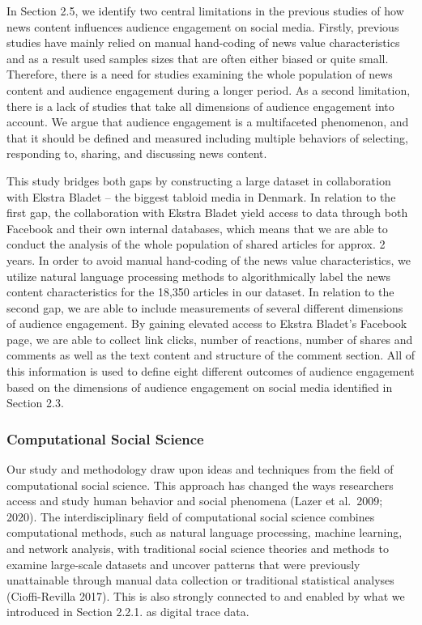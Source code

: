 \documentclass[
]{article}
\begin{document}
In Section 2.5, we identify two central limitations in the previous
studies of how news content influences audience engagement on social
media. Firstly, previous studies have mainly relied on manual
hand-coding of news value characteristics and as a result used samples
sizes that are often either biased or quite small. Therefore, there is a
need for studies examining the whole population of news content and
audience engagement during a longer period. As a second limitation,
there is a lack of studies that take all dimensions of audience
engagement into account. We argue that audience engagement is a
multifaceted phenomenon, and that it should be defined and measured
including multiple behaviors of selecting, responding to, sharing, and
discussing news content.

This study bridges both gaps by constructing a large dataset in
collaboration with Ekstra Bladet -- the biggest tabloid media in
Denmark. In relation to the first gap, the collaboration with Ekstra
Bladet yield access to data through both Facebook and their own internal
databases, which means that we are able to conduct the analysis of the
whole population of shared articles for approx. 2 years. In order to
avoid manual hand-coding of the news value characteristics, we utilize
natural language processing methods to algorithmically label the news
content characteristics for the 18,350 articles in our dataset. In
relation to the second gap, we are able to include measurements of
several different dimensions of audience engagement. By gaining elevated
access to Ekstra Bladet's Facebook page, we are able to collect link
clicks, number of reactions, number of shares and comments as well as
the text content and structure of the comment section. All of this
information is used to define eight different outcomes of audience
engagement based on the dimensions of audience engagement on social
media identified in Section 2.3.

\hypertarget{computational-social-science}{%
\subsubsection{Computational Social
Science}\label{computational-social-science}}

\noindent Our study and methodology draw upon ideas and techniques from
the field of computational social science. This approach has changed the
ways researchers access and study human behavior and social phenomena
(Lazer et al.~2009; 2020). The interdisciplinary field of computational
social science combines computational methods, such as natural language
processing, machine learning, and network analysis, with traditional
social science theories and methods to examine large-scale datasets and
uncover patterns that were previously unattainable through manual data
collection or traditional statistical analyses (Cioffi-Revilla 2017).
This is also strongly connected to and enabled by what we introduced in
Section 2.2.1. as digital trace data.
\end{document}
